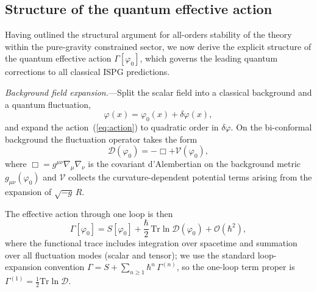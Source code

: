 \documentclass[aps,prd,onecolumn,superscriptaddress,nofootinbib,showpacs,12pt,notitlepage]{revtex4-2}
\begin{document}
\subsection{Structure of the quantum effective action}
\label{sec:effective_action}

Having outlined the structural argument for all-orders
stability of the theory within the pure-gravity constrained
sector, we now derive the explicit structure of the
quantum effective action $\Gamma[\varphi_0]$, which
governs the leading quantum corrections to all classical
ISPG predictions.

\textit{Background field expansion.}---Split the scalar
field into a classical background and a quantum
fluctuation,
\begin{equation}\label{eq:bg_split}
  \varphi(x) = \varphi_0(x) + \delta\varphi(x),
\end{equation}
and expand the action~(\ref{eq:action}) to quadratic
order in $\delta\varphi$.  On the bi-conformal background
the fluctuation operator takes the form
\begin{equation}\label{eq:fluct_op}
  \mathcal{D}(\varphi_0)
  = -\Box + \mathcal{V}(\varphi_0),
\end{equation}
where $\Box = g^{\mu\nu}\nabla_\mu\nabla_\nu$ is the
covariant d'Alembertian on the background metric
$g_{\mu\nu}(\varphi_0)$ and $\mathcal{V}$ collects the
curvature-dependent potential terms arising from the
expansion of $\sqrt{-g}\,R$.

The effective action through one loop is then
\begin{equation}\label{eq:Gamma1}
  \Gamma[\varphi_0]
  = S[\varphi_0]
    + \frac{\hbar}{2}\,\mathrm{Tr}\ln
      \mathcal{D}(\varphi_0)
    + \mathcal{O}(\hbar^2),
\end{equation}
where the functional trace includes integration over
spacetime and summation over all fluctuation modes
(scalar and tensor); we use the standard loop-expansion
convention $\Gamma = S + \sum_{n\geq 1}\hbar^n\,\Gamma^{(n)}$,
so the one-loop term proper is $\Gamma^{(1)}=\tfrac{1}{2}\mathrm{Tr}\ln\mathcal{D}$.
\end{document}
